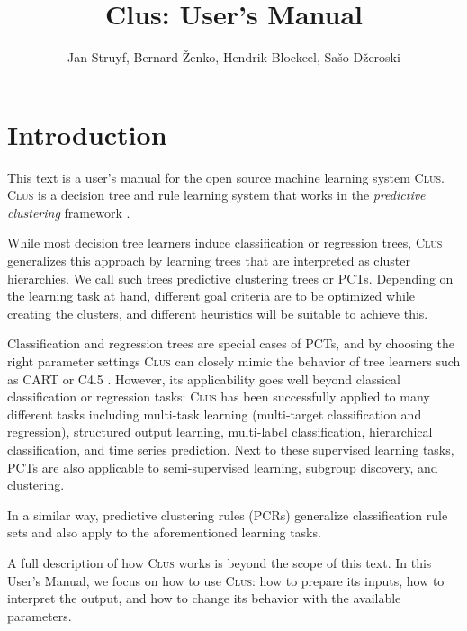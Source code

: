 \documentclass[a4paper]{report}
\newcommand{\clus}{\textsc{Clus}}
\begin{document}
\title{Clus: User's Manual}

\author{Jan Struyf, Bernard \v{Z}enko, Hendrik Blockeel, Sa\v{s}o D\v{z}eroski}

\maketitle



\tableofcontents



\chapter{Introduction}

This text is a user's manual for the open source machine learning system \clus{}. \clus{} is a decision tree and rule learning system that works in the {\em predictive clustering} framework \cite{Blockeel1998icml}.

While most decision tree learners induce classification or regression trees, \clus{} generalizes this approach by learning trees that are interpreted as cluster hierarchies. We call such trees predictive clustering trees or PCTs. Depending on the learning task at hand, different goal criteria are to be optimized while creating the clusters, and different heuristics will be suitable to achieve this.

Classification and regression trees are special cases of PCTs, and by choosing the right parameter settings \clus{} can closely mimic the behavior of tree learners such as CART \cite{Breiman84:other} or C4.5 \cite{Quinlan93:other}.  However, its applicability goes well beyond classical classification or regression tasks: \clus{} has been successfully applied to many different tasks including multi-task learning (multi-target classification and regression), structured output learning, multi-label classification, hierarchical classification, and time series prediction. Next to these supervised learning tasks, PCTs are also applicable to semi-supervised learning, subgroup discovery, and clustering.

In a similar way, predictive clustering rules (PCRs) generalize classification rule sets \cite{Clark91:proc} and also apply to the aforementioned learning tasks.

A full description of how \clus{} works is beyond the scope of this text. In this User's Manual, we focus on how to use \clus{}: how to prepare its inputs, how to interpret the output, and how to change its behavior with the available parameters.
\end{document}
